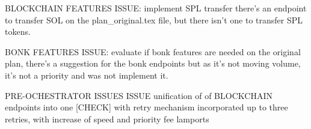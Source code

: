 BLOCKCHAIN FEATURES
    ISSUE: implement SPL transfer
        there's an endpoint to transfer SOL on the plan_original.tex file, but there isn't one to transfer SPL tokens.


BONK FEATURES
    ISSUE: evaluate if bonk features are needed
        on the original plan, there's a suggestion for the bonk endpoints but as it's not moving volume, it's not a priority and was not implement it. 


PRE-OCHESTRATOR ISSUES
    ISSUE   
        unification of of BLOCKCHAIN endpoints into one 
            [CHECK] with retry mechanism incorporated up to three retries, with increase of speed and priority fee lamports